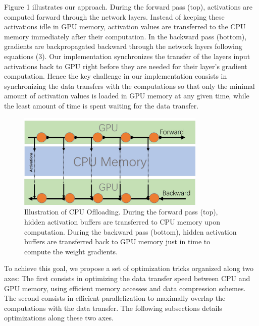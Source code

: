 \documentclass[11pt,onecolumn]{article}
\begin{document}
Figure 1 illustrates our approach. 
During the forward pass (top), activations are computed forward through the network layers.
Instead of keeping these activations idle in GPU memory, activation values are transferred to 
the CPU memory immediately after their computation.
In the backward pass (bottom), gradients are backpropagated backward 
through the network layers following equations (3).
Our implementation synchronizes the transfer of the layers input activations back to GPU
right before they are needed for their layer's gradient computation.
Hence the key challenge in our implementation consists in synchronizing the data
transfers with the computations so that only the minimal amount of activation values 
is loaded in GPU memory at any given time, while the least amount of time is spent 
waiting for the data transfer.

\begin{figure}[h!]
\centering
\includegraphics[width=0.8\textwidth]{Figure1.jpg}
\caption{Illustration of CPU Oflloading. 
During the forward pass (top), 
hidden activation buffers are transferred to CPU memory upon computation.
During the backward pass (bottom), hidden activation buffers 
are transferred back to GPU memory just in time to compute the 
weight gradients.}
\end{figure}

To achieve this goal, we propose a set of optimization tricks organized along two axes:
The first consists in optimizing the data transfer speed between CPU and GPU memory,
using efficient memory accesses and data compression schemes.
The second consists in efficient parallelization to maximally overlap the computations
with the data transfer.
The following subsections details optimizations along these two axes.
\end{document}

